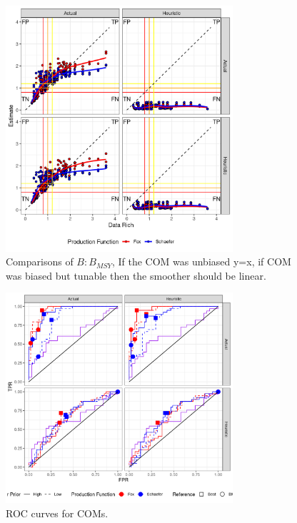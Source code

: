 \begin{figure}[ht!]
\centering
\includegraphics[width=0.75\textwidth]{figs/cf-1.png}
\caption{Comparisons of $B:B_{MSY}$, If the COM was unbiased y=x, if COM was biased but tunable then the smoother should be linear.}
\label{fig:cf}
\end{figure}

\begin{figure}[ht!]
\centering
\includegraphics[width=0.75\textwidth]{figs/roc-1.png}
\caption{ROC curves for COMs.}
\label{fig:roc}
\end{figure}
